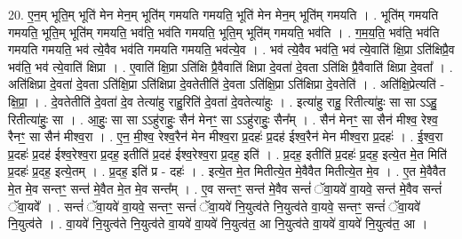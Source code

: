 \documentclass[17pt]{extarticle}
\begin{document}
20. ए॒न॒म् भूति॒म् भूति॑ मेन मेन॒म् भूति॑म् गमयति गमयति॒ भूति॑ मेन मेन॒म् भूति॑म् गमयति । . भूति॑म् गमयति गमयति॒ भूति॒म् भूति॑म् गमयति॒ भव॑ति॒ भव॑ति गमयति॒ भूति॒म् भूति॑म् गमयति॒ भव॑ति । . ग॒म॒य॒ति॒ भव॑ति॒ भव॑ति गमयति गमयति॒ भव॑ त्ये॒वैव भव॑ति गमयति गमयति॒ भव॑त्ये॒व । . भव॑ त्ये॒वैव भव॑ति॒ भव॑ त्ये॒वाति॑ क्षि॒प्रा ऽति॑क्षिप्रै॒व भव॑ति॒ भव॑ त्ये॒वाति॑ क्षिप्रा । . ए॒वाति॑ क्षि॒प्रा ऽति॑क्षि प्रै॒वैवाति॑ क्षिप्रा दे॒वता॑ दे॒वता ऽति॑क्षि प्रै॒वैवाति॑ क्षिप्रा दे॒वता᳚ । . अति॑क्षिप्रा दे॒वता॑ दे॒वता ऽति॑क्षि॒प्रा ऽति॑क्षिप्रा दे॒वतेतीति॑ दे॒वता ऽति॑क्षि॒प्रा ऽति॑क्षिप्रा दे॒वतेति॑ । . अति॑क्षि॒प्रेत्यति॑ - क्षि॒प्रा॒ । . दे॒वतेतीति॑ दे॒वता॑ दे॒व तेत्या॑हु राहु॒रिति॑ दे॒वता॑ दे॒वतेत्या॑हुः । . इत्या॑हु राहु॒ रितीत्या॑हुः॒ सा सा ऽऽहु॒ रितीत्या॑हुः॒ सा । . आ॒हुः॒ सा सा ऽऽहु॑राहुः॒ सैन॑ मेनꣳ॒॒ सा ऽऽहु॑राहुः॒ सैन᳚म् । . सैन॑ मेनꣳ॒॒ सा सैन॑ मीश्व॒ रेश्व॒ रैनꣳ॒॒ सा सैन॑ मीश्व॒रा । . ए॒न॒ मी॒श्व॒ रेश्व॒रैन॑ मेन मीश्व॒रा प्र॒दहः॑ प्र॒दह॑ ईश्व॒रैन॑ मेन मीश्व॒रा प्र॒दहः॑ । . ई॒श्व॒रा प्र॒दहः॑ प्र॒दह॑ ईश्व॒रेश्व॒रा प्र॒दह॒ इतीति॑ प्र॒दह॑ ईश्व॒रेश्व॒रा प्र॒दह॒ इति॑ । . प्र॒दह॒ इतीति॑ प्र॒दहः॑ प्र॒दह॒ इत्ये॒त मे॒त मिति॑ प्र॒दहः॑ प्र॒दह॒ इत्ये॒तम् । . प्र॒दह॒ इति॑ प्र - दहः॑ । . इत्ये॒त मे॒त मितीत्ये॒त मे॒वैवैत मितीत्ये॒त मे॒व । . ए॒त मे॒वैवैत मे॒त मे॒व सन्तꣳ॒॒ सन्त॑ मे॒वैत मे॒त मे॒व सन्त᳚म् । . ए॒व सन्तꣳ॒॒ सन्त॑ मे॒वैव सन्तं॑ ॅवा॒यवे॑ वा॒यवे॒ सन्त॑ मे॒वैव सन्तं॑ ॅवा॒यवे᳚ । . सन्तं॑ ॅवा॒यवे॑ वा॒यवे॒ सन्तꣳ॒॒ सन्तं॑ ॅवा॒यवे॑ नि॒युत्व॑ते नि॒युत्व॑ते वा॒यवे॒ सन्तꣳ॒॒ सन्तं॑ ॅवा॒यवे॑ नि॒युत्व॑ते । . वा॒यवे॑ नि॒युत्व॑ते नि॒युत्व॑ते वा॒यवे॑ वा॒यवे॑ नि॒युत्व॑त॒ आ नि॒युत्व॑ते वा॒यवे॑ वा॒यवे॑ नि॒युत्व॑त॒ आ । \newline
\end{document}
